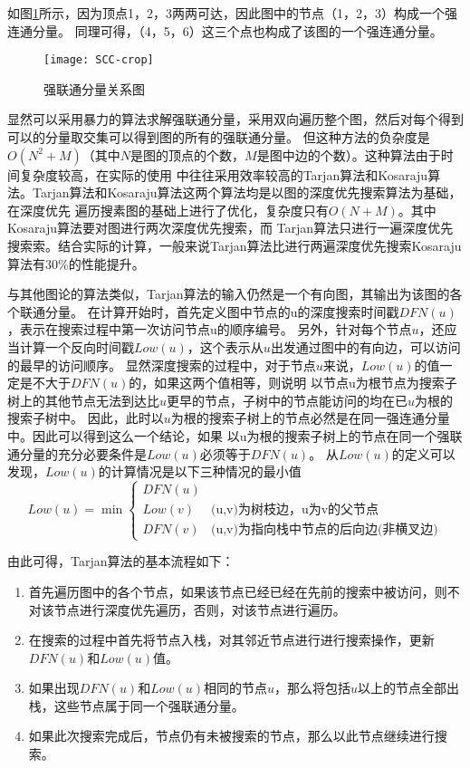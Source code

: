 如图\ref{fig:SCC}所示，因为顶点1，2，3两两可达，因此图中的节点（1，2，3）构成一个强连通分量。
同理可得，（4，5，6）这三个点也构成了该图的一个强连通分量。
\begin{figure}[htbp]
\centering\texttt{[image: SCC-crop]}
\caption{强联通分量关系图}\label{fig:SCC}
\end{figure}
显然可以采用暴力的算法求解强联通分量，采用双向遍历整个图，然后对每个得到可以的分量取交集可以得到图的所有的强联通分量。
但这种方法的负杂度是$O({N}^{2} + M)$（其中$N$是图的顶点的个数，$M$是图中边的个数）。这种算法由于时间复杂度较高，在实际的使用
中往往采用效率较高的Tarjan算法和Kosaraju算法。Tarjan算法\cite{ref18}和Kosaraju算法这两个算法均是以图的深度优先搜索算法为基础，在深度优先
遍历搜素图的基础上进行了优化，复杂度只有$O(N + M)$。其中Kosaraju算法要对图进行两次深度优先搜索，而
Tarjan算法只进行一遍深度优先搜索索。结合实际的计算，一般来说Tarjan算法比进行两遍深度优先搜索Kosaraju算法有30\%的性能提升。

与其他图论的算法类似，Tarjan算法的输入仍然是一个有向图，其输出为该图的各个联通分量。
在计算开始时，首先定义图中节点的u的深度搜索时间戳$DFN(u)$，表示在搜索过程中第一次访问节点u的顺序编号。
另外，针对每个节点$u$，还应当计算一个反向时间戳$Low(u)$，这个表示从$u$出发通过图中的有向边，可以访问的最早的访问顺序。
显然深度搜索的过程中，对于节点$u$来说，$Low(u)$的值一定是不大于$DFN(u)$的，如果这两个值相等，则说明
以节点u为根节点为搜索子树上的其他节点无法到达比$u$更早的节点，子树中的节点能访问的均在已$u$为根的搜索子树中。
因此，此时以$u$为根的搜索子树上的节点必然是在同一强连通分量中。因此可以得到这么一个结论，如果
以u为根的搜索子树上的节点在同一个强联通分量的充分必要条件是$Low(u)$必须等于$DFN(u)$。
从$Low(u)$的定义可以发现，$Low(u)$的计算情况是以下三种情况的最小值
$$Low(u)=\min
\begin{cases}
DFN(u) & \\
Low(v)& \text{(u,v)为树枝边，u为v的父节点}\\
DFN(v)& \text{(u,v)为指向栈中节点的后向边(非横叉边)}
\end{cases}$$

由此可得，Tarjan算法的基本流程如下：
\begin{enumerate}
\item	首先遍历图中的各个节点，如果该节点已经已经在先前的搜索中被访问，则不对该节点进行深度优先遍历，否则，对该节点进行遍历。
\item	在搜索的过程中首先将节点入栈，对其邻近节点进行进行搜索操作，更新$DFN(u)$和$Low(u)$值。
\item	如果出现$DFN(u)$和$Low(u)$相同的节点$u$，那么将包括$u$以上的节点全部出栈，这些节点属于同一个强联通分量。
\item 如果此次搜索完成后，节点仍有未被搜索的节点，那么以此节点继续进行搜索。
\end{enumerate}

